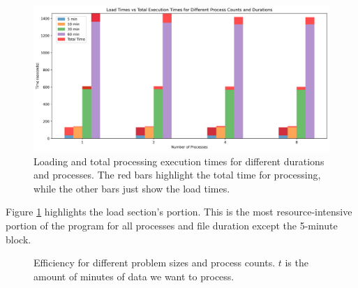 \begin{figure}[!h]
    \centering
    \includegraphics[scale=0.50]{figures/judasex.png}
    \caption{Loading and total processing execution times for different durations and processes. The red bars highlight the total time for processing, while the other bars just show the load times.}
    \label{fig:judasextime}
\end{figure}

Figure \ref{fig:judasextime} highlights the load section's portion. This is the most resource-intensive portion of the program for all processes and file duration except the 5-minute block. 


\begin{figure}[!htbp]
\centering
{}
\caption{Efficiency for different problem sizes and process counts. $t$ is the amount of minutes of data we want to process.}
\label{fig:judasefficiency}
\end{figure}

